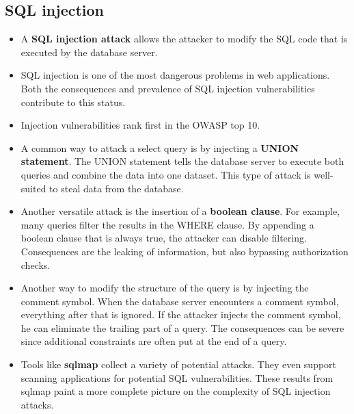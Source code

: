 \documentclass[../main.tex]{subfiles}
\begin{document}
\subsection{SQL injection}
\begin{itemize}
\item A \textbf{SQL injection attack} allows the attacker to modify the SQL code that is executed by the database server.
\item SQL injection is one of the most dangerous problems in web applications. Both the consequences and prevalence of SQL injection vulnerabilities contribute to this status.
\item Injection vulnerabilities rank first in the OWASP top 10.
\item A common way to attack a select query is by injecting a \textbf{UNION statement}. The UNION statement tells the database server to execute both queries and combine the data into one dataset. This type of attack is well-suited to steal data from the database.
\item Another versatile attack is the insertion of a \textbf{boolean clause}. For example, many queries filter the results in the WHERE clause. By appending a boolean clause that is always true, the attacker can disable filtering. Consequences are the leaking of information, but also bypassing authorization checks.
\item Another way to modify the structure of the query is by injecting the comment symbol. When the database server encounters a comment symbol, everything after that is ignored. If the attacker injects the comment symbol, he can eliminate the trailing part of a query. The consequences can be severe since additional constraints are often put at the end of a query.
\item Tools like \textbf{sqlmap} collect a variety of potential attacks. They even support scanning applications for potential SQL vulnerabilities. These results from sqlmap paint a more complete picture on the complexity of SQL injection attacks.
\end{itemize}
\end{document}
